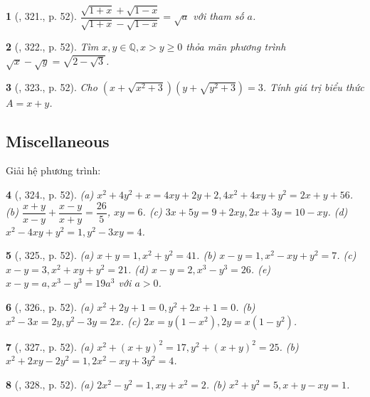 \documentclass{article}
\newtheorem{baitoan}{}
\begin{document}
\begin{baitoan}[\cite{Binh_Toan_9_tap_2}, 321., p. 52]
	$\dfrac{\sqrt{1 + x} + \sqrt{1 - x}}{\sqrt{1 + x} - \sqrt{1 - x}} = \sqrt{a}$ với tham số $a$.
\end{baitoan}

\begin{baitoan}[\cite{Binh_Toan_9_tap_2}, 322., p. 52]
	Tìm $x,y\in\mathbb{Q},x > y\ge0$ thỏa mãn phương trình $\sqrt{x} - \sqrt{y} = \sqrt{2 - \sqrt{3}}$.
\end{baitoan}

\begin{baitoan}[\cite{Binh_Toan_9_tap_2}, 323., p. 52]
	Cho $\left(x + \sqrt{x^2 + 3}\right)\left(y + \sqrt{y^2 + 3}\right) = 3$. Tính giá trị biểu thức $A = x + y$.
\end{baitoan}

\subsection{Miscellaneous}
Giải hệ phương trình:

\begin{baitoan}[\cite{Binh_Toan_9_tap_2}, 324., p. 52]
	(a) $x^2 + 4y^2 + x = 4xy + 2y + 2,4x^2 + 4xy + y^2 = 2x + y + 56$. (b) $\dfrac{x + y}{x - y} + \dfrac{x - y}{x + y} = \dfrac{26}{5}$, $xy = 6$. (c) $3x + 5y = 9 + 2xy,2x + 3y = 10 - xy$. (d) $x^2 - 4xy + y^2 = 1,y^2 - 3xy = 4$.
\end{baitoan}

\begin{baitoan}[\cite{Binh_Toan_9_tap_2}, 325., p. 52]
	(a) $x + y = 1,x^2 + y^2 = 41$. (b) $x - y = 1,x^2 - xy + y^2 = 7$. (c) $x - y = 3,x^2 + xy + y^2 = 21$. (d) $x - y = 2,x^3 - y^3 = 26$. (e) $x - y = a,x^3 - y^3 = 19a^3$ với $a > 0$.
\end{baitoan}

\begin{baitoan}[\cite{Binh_Toan_9_tap_2}, 326., p. 52]
	(a) $x^2 + 2y + 1 = 0,y^2 + 2x + 1 = 0$. (b) $x^2 - 3x = 2y,y^2 - 3y = 2x$. (c) $2x = y(1 - x^2),2y = x(1 - y^2)$.
\end{baitoan}

\begin{baitoan}[\cite{Binh_Toan_9_tap_2}, 327., p. 52]
	(a) $x^2 + (x + y)^2 = 17,y^2 + (x + y)^2 = 25$. (b) $x^2 + 2xy - 2y^2 = 1,2x^2 - xy + 3y^2 = 4$.
\end{baitoan}

\begin{baitoan}[\cite{Binh_Toan_9_tap_2}, 328., p. 52]
	(a) $2x^2 - y^2 = 1,xy + x^2 = 2$. (b) $x^2 + y^2 = 5,x + y - xy = 1$.
\end{baitoan}
\end{document}
